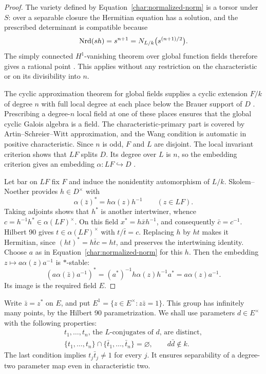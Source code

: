 \begin{proof}
The variety defined by Equation~\ref{char:normalized-norm} is a torsor
under $S$: over a separable closure the Hermitian equation has a solution,
and the prescribed determinant is compatible because
\[
 \operatorname{Nrd}(sh)=s^{n+1}=N_{L/k}\bigl(s^{(n+1)/2}\bigr).
\]
The simply connected $H^1$-vanishing theorem over global function fields
therefore gives a rational point \cite{Harder,Conrad}. This applies without
any restriction on the characteristic or on its divisibility into $n$.

The cyclic approximation theorem for global fields supplies a cyclic
extension $F/k$ of degree $n$ with full local degree at each place
below the Brauer support of $D$
\cite[Theorems~1--2 and Section~4]{LorenzRoquette}. Prescribing a
degree-$n$ local field at one of these places ensures that the global
cyclic Galois algebra is a field. The characteristic-primary part is covered
by Artin--Schreier--Witt approximation, and the Wang condition is
automatic in positive characteristic. Since $n$ is odd, $F$ and $L$
are disjoint.
The local invariant criterion shows that $LF$ splits $D$. Its degree
over $L$ is $n$, so the embedding criterion gives an embedding
$\alpha:LF\hookrightarrow D$ \cite{Reiner}.

Let bar on $LF$ fix $F$ and induce the nonidentity automorphism of $L/k$.
Skolem--Noether provides $h\in D^\times$ with
\[
 \alpha(\bar z)^*=h\alpha(z)h^{-1}\qquad(z\in LF).
\]
Taking adjoints shows that $h^*$ is another intertwiner, whence
$c=h^{-1}h^*\in\alpha(LF)^\times$. On this field
$x^*=h\bar xh^{-1}$, and consequently $\bar c=c^{-1}$.
Hilbert 90 gives $t\in\alpha(LF)^\times$ with $t/\bar t=c$.
Replacing $h$ by $ht$ makes it Hermitian, since
$(ht)^*=h\bar t c=ht$, and preserves the intertwining identity.
Choose $a$ as in Equation~\ref{char:normalized-norm} for this $h$.
Then the embedding $z\mapsto a\alpha(z)a^{-1}$ is $*$-stable:
\[
 (a\alpha(\bar z)a^{-1})^*
 =(a^*)^{-1}h\alpha(z)h^{-1}a^*
 =a\alpha(z)a^{-1}.
\]
Its image is the required field $E$.
\end{proof}

Write $\bar z=z^*$ on $E$, and put
$E^1=\{z\in E^\times:z\bar z=1\}$. This group has infinitely many
points, by the Hilbert 90 parametrization. We shall use parameters
$d\in E^\times$ with the following properties:
\begin{equation}\label{char:parameter-conditions}
\begin{gathered}
 t_1,\ldots,t_n\text{, the $L$-conjugates of $d$, are distinct},\\
 \{t_1,\ldots,t_n\}\cap\{\bar t_1,\ldots,\bar t_n\}=\varnothing,
 \qquad d\bar d\notin k.
\end{gathered}
\end{equation}
The last condition implies $t_j\bar t_j\ne1$ for every $j$.
It ensures separability of a degree-two parameter map even in
characteristic two.

